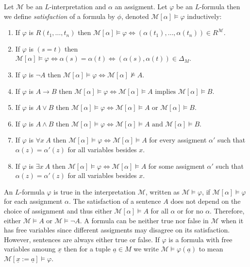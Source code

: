 \documentclass[12pt]{article}
\newcommand{\entails}{\models}
\newcommand{\Mmod}{\mathcal{M}}
\newcommand{\ul}[1]{\underline{#1}}
\newenvironment{definition}[1][Definition:]{\begin{trivlist}
\item[\hskip \labelsep {\bfseries #1}]}{\end{trivlist}}
\theoremstyle{theorem}
\theoremstyle{definition}
\theoremstyle{definition}
\theoremstyle{remark}
\theoremstyle{definition}
\theoremstyle{remark}
\begin{document}
\begin{definition}
Let $\Mmod$ be an $L$-interpretation and $\alpha$ an assigment. Let $\varphi$ be an $L$-formula then we define \textit{satisfaction} of a formula by $\phi$, denoted $\Mmod[\alpha] \entails \varphi$ inductively:
\begin{enumerate}
\item If $\varphi$ is $R(t_1, \dots, t_n)$ then $\Mmod[\alpha] \entails \varphi \iff (\alpha(t_1), \dots, \alpha(t_n)) \in R^{\Mmod}$.
\item If $\varphi$ is $(s = t)$ then $\Mmod[\alpha] \entails \varphi \iff \alpha(s) = \alpha(t) \iff (\alpha(s), \alpha(t)) \in \Delta_M$. 
\item If $\varphi$ is $\neg A$ then $\Mmod[\alpha] \entails \varphi \iff \Mmod[\alpha] \not\entails A$.
\item If $\varphi$ is $A \to B$ then $\Mmod[\alpha] \entails \varphi \iff \Mmod[\alpha] \entails A \text{ implies } \Mmod[\alpha] \entails B$.
\item If $\varphi$ is $A \vee B$ then $\Mmod[\alpha] \entails \varphi \iff \Mmod[\alpha] \entails A \text{ or } \Mmod[\alpha] \entails B$.
\item If $\varphi$ is $A \wedge B$ then $\Mmod[\alpha] \entails \varphi \iff \Mmod[\alpha] \entails A \text{ and } \Mmod[\alpha] \entails B$.
\item If $\varphi$ is $\forall x \: A$ then $\Mmod[\alpha] \entails \varphi \iff \Mmod[\alpha] \entails A$ for every assigment $\alpha'$ such that $\alpha(z) = \alpha'(z)$ for all variables besides $x$.
\item If $\varphi$ is $\exists x \: A$ then $\Mmod[\alpha] \entails \varphi \iff \Mmod[\alpha] \entails A$ for some assigment $\alpha'$ such that $\alpha(z) = \alpha'(z)$ for all variables besides $x$.
\end{enumerate}
An $L$-formula $\varphi$ is true in the interpretation $\Mmod$, written as $\Mmod \entails \varphi$, if $\Mmod[\alpha] \entails \varphi$ for each assignment $\alpha$. The satisfaction of a sentence $A$ does not depend on the choice of assignment and thus either $\Mmod[\alpha] \entails A$ for all $\alpha$ or for no $\alpha$. Therefore, either $\Mmod \entails A$ or $\Mmod \entails \neg A$. A formula can be neither true nor false in $\Mmod$ when it has free variables since different assigments may disagree on its satisfaction. However, sentences are always either true or false. If $\varphi$ is a formula with free variables amoung $\ul{x}$ then for a tuple $\ul{a} \in M$ we write $\Mmod \entails \varphi(\ul{a})$ to mean $\Mmod[\ul{x} := \ul{a}] \entails \varphi$. 
\end{definition}
\end{document}

